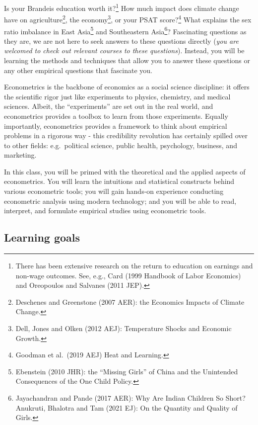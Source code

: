 \documentclass[
]{article}
\begin{document}
Is your Brandeis education worth it?\footnote{There has been extensive
  research on the return to education on earnings and non-wage outcomes.
  See, e.g., Card (1999 Handbook of Labor Economics) and Oreopoulos and
  Salvanes (2011 JEP).} How much impact does climate change have on
agriculture\footnote{Deschenes and Greenstone (2007 AER): the Economics
  Impacts of Climate Change.}, the economy\footnote{Dell, Jones and
  Olken (2012 AEJ): Temperature Shocks and Economic Growth.}, or your
PSAT score?\footnote{Goodman et al.~(2019 AEJ) Heat and Learning.} What
explains the sex ratio imbalance in East Asia\footnote{Ebenstein (2010
  JHR): the ``Missing Girls'' of China and the Unintended Consequences
  of the One Child Policy.} and Southeastern Asia\footnote{Jayachandran
  and Pande (2017 AER): Why Are Indian Children So Short? Anukruti,
  Bhalotra and Tam (2021 EJ): On the Quantity and Quality of Girls.}?
Fascinating questions as they are, we are not here to seek answers to
these questions directly (\emph{you are welcomed to check out relevant
courses to these questions}). Instead, you will be learning the methods
and techniques that allow you to answer these questions or any other
empirical questions that fascinate you.

Econometrics is the backbone of economics as a social science
discipline: it offers the scientific rigor just like experiments to
physics, chemistry, and medical sciences. Albeit, the ``experiments''
are set out in the real world, and econometrics provides a toolbox to
learn from those experiments. Equally importantly, econometrics provides
a framework to think about empirical problems in a rigorous way - this
credibility revolution has certainly spilled over to other fields:
e.g.~political science, public health, psychology, business, and
marketing.

In this class, you will be primed with the theoretical and the applied
aspects of econometrics. You will learn the intuitions and statistical
constructs behind various econometric tools; you will gain hands-on
experience conducting econometric analysis using modern technology; and
you will be able to read, interpret, and formulate empirical studies
using econometric tools.

\hypertarget{learning-goals}{%
\subsection{Learning goals}\label{learning-goals}}
\end{document}
